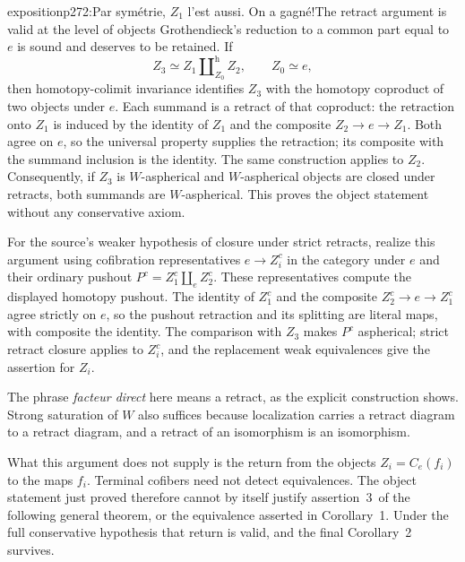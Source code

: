 \begin{dcomment}{exposition}{p272:Par symétrie, $Z_1$ l'est aussi. On a gagné!}{The retract argument is valid at the level of objects}
Grothendieck's reduction to a common part equal to $e$ is sound and deserves to be retained. If
\[
 Z_3\simeq Z_1\amalg^{\mathrm h}_{Z_0}Z_2,
 \qquad Z_0\simeq e,
\]
then homotopy-colimit invariance identifies $Z_3$ with the homotopy coproduct of two objects under $e$. Each summand is a retract of that coproduct: the retraction onto $Z_1$ is induced by the identity of $Z_1$ and the composite $Z_2\to e\to Z_1$. Both agree on $e$, so the universal property supplies the retraction; its composite with the summand inclusion is the identity. The same construction applies to $Z_2$. Consequently, if $Z_3$ is $W$-aspherical and $W$-aspherical objects are closed under retracts, both summands are $W$-aspherical. This proves the object statement without any conservative axiom.

For the source's weaker hypothesis of closure under strict retracts, realize this argument using cofibration representatives $e\to Z_i^c$ in the category under $e$ and their ordinary pushout $P^c=Z_1^c\amalg_e Z_2^c$. These representatives compute the displayed homotopy pushout. The identity of $Z_1^c$ and the composite $Z_2^c\to e\to Z_1^c$ agree strictly on $e$, so the pushout retraction and its splitting are literal maps, with composite the identity. The comparison with $Z_3$ makes $P^c$ aspherical; strict retract closure applies to $Z_i^c$, and the replacement weak equivalences give the assertion for $Z_i$.

The phrase \emph{facteur direct} here means a retract, as the explicit construction shows. Strong saturation of $W$ also suffices because localization carries a retract diagram to a retract diagram, and a retract of an isomorphism is an isomorphism.

What this argument does not supply is the return from the objects $Z_i=C_e(f_i)$ to the maps $f_i$. Terminal cofibers need not detect equivalences. The object statement just proved therefore cannot by itself justify assertion~3\,\textdegree{} of the following general theorem, or the equivalence asserted in Corollary~1. Under the full conservative hypothesis that return is valid, and the final Corollary~2 survives.
\end{dcomment}

